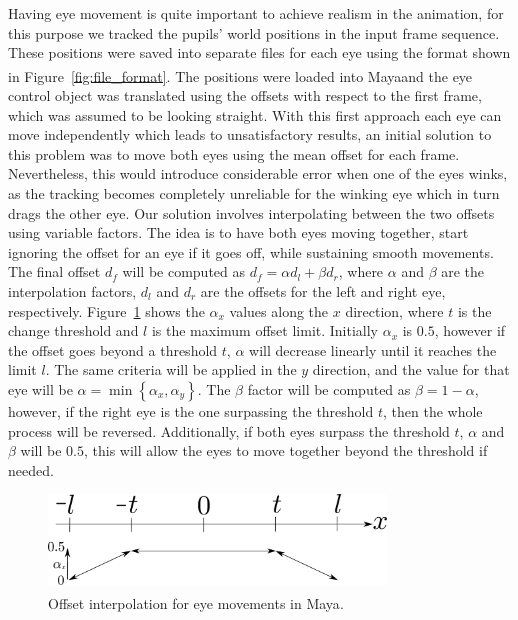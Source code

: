 \documentclass[11pt]{report}
\newcommand{\Maya}{Maya\textsuperscript\textregistered}
\begin{document}
Having eye movement is quite important to achieve realism in the animation, for this purpose we tracked the pupils' world positions in the input frame sequence.
These positions were saved into separate files for each eye using the format shown in Figure~\ref{fig:file_format}.
The positions were loaded into \Maya and the eye control object was translated using the offsets with respect to the first frame, which was assumed to be looking straight.
With this first approach each eye can move independently which leads to unsatisfactory results, an initial solution to this problem was to move both eyes using the mean offset for each frame.
Nevertheless, this would introduce considerable error when one of the eyes winks, as the tracking becomes completely unreliable for the winking eye which in turn drags the other eye.
Our solution involves interpolating between the two offsets using variable factors.
The idea is to have both eyes moving together, start ignoring the offset for an eye if it goes off, while sustaining smooth movements.
The final offset $d_f$ will be computed as $d_f = \alpha d_l + \beta d_r$, where $\alpha$ and $\beta$ are the interpolation factors, $d_l$ and $d_r$ are the offsets for the left and right eye, respectively.
Figure~\ref{fig:eyes_interpolation} shows the $\alpha_x$ values along the $x$ direction, where $t$ is the change threshold and $l$ is the maximum offset limit.
Initially $\alpha_x$ is $0.5$, however if the offset goes beyond a threshold $t$, $\alpha$ will decrease linearly until it reaches the limit $l$.
The same criteria will be applied in the $y$ direction, and the value for that eye will be $\alpha = \min \left\lbrace \alpha_x, \alpha_y \right\rbrace$.
The $\beta$ factor will be computed as $\beta = 1 - \alpha$, however, if the right eye is the one surpassing the threshold $t$, then the whole process will be reversed. 
Additionally, if both eyes surpass the threshold $t$, $\alpha$ and $\beta$ will be $0.5$, this will allow the eyes to move together beyond the threshold if needed.

\begin{figure}[htbp!]
\centering
\includegraphics[width=0.8\textwidth]{img/eyes_interpolation}
	\caption{Offset interpolation for eye movements in \Maya.}
	\label{fig:eyes_interpolation}
\end{figure}
\end{document}
